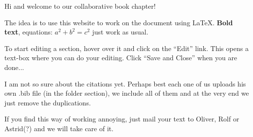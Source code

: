 Hi and welcome to our collaborative book chapter!  

The idea is to use this website to work on the document using \LaTeX.  \textbf{Bold text}, equations: $a^2+b^2=c^2$ just work as usual.  

To start editing a section, hover over it and click on the ``Edit'' link.  This opens a text-box where you can do your editing.  Click ``Save and Close'' when you are done...

I am not so sure about the citations yet.  Perhaps best each one of us uploads his own .bib file (in the folder section), we include all of them and at the very end we just remove the duplications.  

If you find this way of working annoying, just mail your text to Oliver, Rolf or Astrid(?) and we will take care of it.  